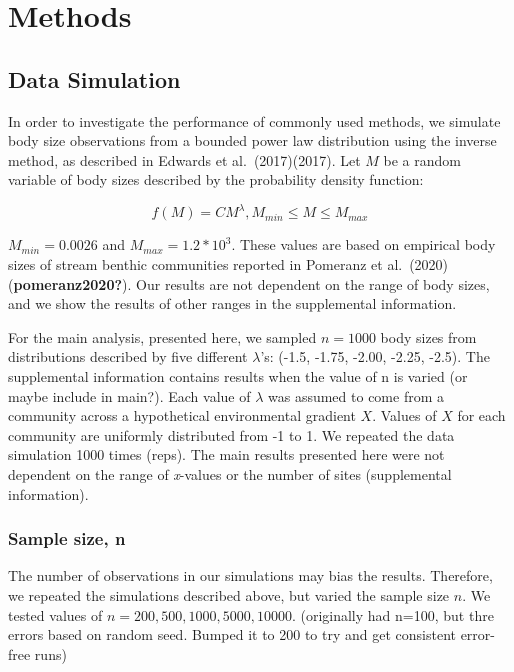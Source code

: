 \documentclass[
]{article}
\begin{document}
\hypertarget{methods}{%
\section{Methods}\label{methods}}

\hypertarget{data-simulation}{%
\subsection{Data Simulation}\label{data-simulation}}

In order to investigate the performance of commonly used methods, we
simulate body size observations from a bounded power law distribution
using the inverse method, as described in Edwards et al.~(2017)(2017).
Let \(M\) be a random variable of body sizes described by the
probability density function:

\[f(M) = CM^\lambda, M_{min} \le M \le M_{max} \]

\(M_{min} = 0.0026\) and \(M_{max} = 1.2 *10^3\). These values are based
on empirical body sizes of stream benthic communities reported in
Pomeranz et al.~(2020)(\textbf{pomeranz2020?}). Our results are not
dependent on the range of body sizes, and we show the results of other
ranges in the supplemental information.

For the main analysis, presented here, we sampled \(n = 1000\) body
sizes from distributions described by five different \(\lambda\)'s:
(-1.5, -1.75, -2.00, -2.25, -2.5). The supplemental information contains
results when the value of n is varied (or maybe include in main?). Each
value of \(\lambda\) was assumed to come from a community across a
hypothetical environmental gradient \(X\). Values of \(X\) for each
community are uniformly distributed from -1 to 1. We repeated the data
simulation 1000 times (reps). The main results presented here were not
dependent on the range of \emph{x}-values or the number of sites
(supplemental information).

\hypertarget{sample-size-n}{%
\subsubsection{Sample size, n}\label{sample-size-n}}

The number of observations in our simulations may bias the results.
Therefore, we repeated the simulations described above, but varied the
sample size \(n\). We tested values of
\(n = 200, 500, 1000, 5000, 10 000\). (originally had n=100, but thre
errors based on random seed. Bumped it to 200 to try and get consistent
error-free runs)
\end{document}
